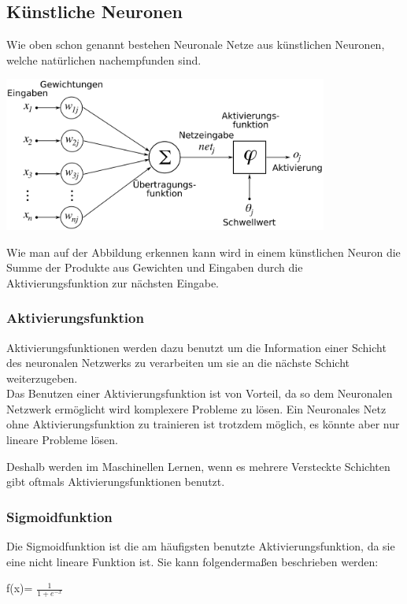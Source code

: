 \subsection{Künstliche Neuronen}
Wie oben schon genannt bestehen Neuronale Netze aus künstlichen Neuronen, welche natürlichen nachempfunden sind.\begin{center}


\includegraphics[width=0.8\textwidth]{Bilder/ArtificialNeuronModel_deutsch.png}\cite{das}\end{center}
Wie man auf der Abbildung erkennen kann wird in einem künstlichen Neuron die Summe der Produkte aus Gewichten und Eingaben durch die Aktivierungsfunktion zur nächsten Eingabe.
\subsubsection*{Aktivierungsfunktion}

	Aktivierungsfunktionen werden dazu benutzt um die Information einer Schicht des neuronalen Netzwerks zu verarbeiten um sie an die nächste Schicht weiterzugeben.\\

	Das Benutzen einer Aktivierungsfunktion ist von Vorteil, da so dem Neuronalen Netzwerk ermöglicht wird komplexere Probleme zu lösen. Ein Neuronales Netz ohne Aktivierungsfunktion zu trainieren ist trotzdem möglich, es könnte aber nur lineare Probleme lösen.
	
	Deshalb werden im Maschinellen Lernen, wenn es mehrere Versteckte Schichten gibt oftmals Aktivierungsfunktionen benutzt.\\
	
\subsubsection*{Sigmoidfunktion} \label{Sig}
	Die Sigmoidfunktion ist die am häufigsten benutzte Aktivierungsfunktion, da sie eine nicht lineare Funktion ist. Sie kann folgendermaßen beschrieben werden:
	\begin{center}
	\large{f(x)= $\frac{1}{1+e^{-x}}$}
	
	\end{center}

